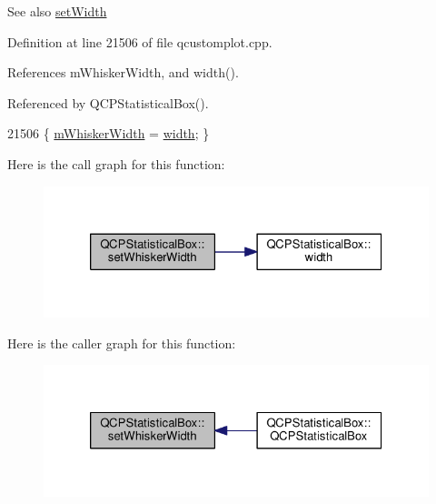 \begin{DoxySeeAlso}{See also}
\hyperlink{class_q_c_p_statistical_box_a0b62775bd67301b1eba5c785f2b26f14}{set\+Width} 
\end{DoxySeeAlso}


Definition at line 21506 of file qcustomplot.\+cpp.



References m\+Whisker\+Width, and width().



Referenced by Q\+C\+P\+Statistical\+Box().


\begin{DoxyCode}
21506 \{ \hyperlink{class_q_c_p_statistical_box_a4d166474f845d5db626e8b11a0815a6f}{mWhiskerWidth} = \hyperlink{class_q_c_p_statistical_box_a0733a7bd575fc5929ce6d507bcc2a04c}{width}; \}
\end{DoxyCode}


Here is the call graph for this function\+:\nopagebreak
\begin{figure}[H]
\begin{center}
\leavevmode
\includegraphics[width=326pt]{class_q_c_p_statistical_box_adf378812446bd66f34d1f7f293d991cd_cgraph}
\end{center}
\end{figure}




Here is the caller graph for this function\+:\nopagebreak
\begin{figure}[H]
\begin{center}
\leavevmode
\includegraphics[width=326pt]{class_q_c_p_statistical_box_adf378812446bd66f34d1f7f293d991cd_icgraph}
\end{center}
\end{figure}



